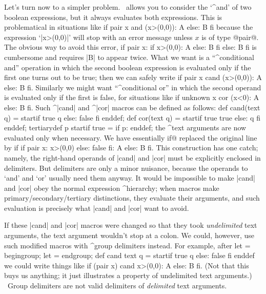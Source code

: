 Let's turn now to a simpler problem. \MF\ allows you to consider the
`^{and}' of two boolean expressions, but it always evaluates both
expressions. This is problematical in situations like
\begintt
if pair x and (x>(0,0)): A else: B fi
\endtt
because the expression `|x>(0,0)|' will stop with an error message
unless $x$ is of type @pair@. The obvious way to avoid this error,
\begintt
if pair x:  if x>(0,0): A else: B fi  else: B fi
\endtt
is cumbersome and requires |B| to appear twice.  What we want is a
``^{conditional and}'' operation in which the second boolean expression is
evaluated only if the first one turns out to be true; then we can safely write
\begintt
if pair x cand (x>(0,0)): A else: B fi.
\endtt
Similarly we might want ``^{conditional or}'' in which the second operand is
evaluated only if the first is false, for situations like
\begintt
if unknown x cor (x<0): A else: B fi.
\endtt
Such ^|cand| and ^|cor| macros can be defined as follows:
\begintt
def cand(text q) = startif true q else: false fi enddef;
def cor(text q) = startif true true else: q fi enddef;
tertiarydef p startif true = if p: enddef;
\endtt
the ^{text arguments} are now evaluated only when necessary. We have essentially
^^@if@ replaced the original line by
\begintt
if if pair x: x>(0,0) else: false fi: A else: B fi.
\endtt
This construction has one catch; namely, the right-hand operands of |cand| and
|cor| must be explicitly enclosed in delimiters. But delimiters are only a
minor nuisance, because the operands to `and' and `or' usually need them
anyway. It would be impossible to make |cand| and |cor| obey the normal
expression ^{hierarchy}; when macros make primary/secondary/tertiary
distinctions, they evaluate their arguments, and such evaluation is
precisely what |cand| and |cor| want to avoid.

If these |cand| and |cor| macros were changed so that they took
{\sl undelimited\/} text arguments, the text argument wouldn't stop at a colon.
We could, however, use such modified macros with ^{group delimiters}
instead. For example, after
\begintt
let {{ = begingroup; let }} = endgroup;
def cand text q = startif true q else: false fi enddef
\endtt
we could write things like
\begintt
if {{(pair x) cand x>(0,0)}}: A else: B fi.
\endtt
(Not that this buys us anything; it just illustrates a property of
undelimited text arguments.) \ Group delimiters
are not valid delimiters of {\sl delimited\/} text arguments.

